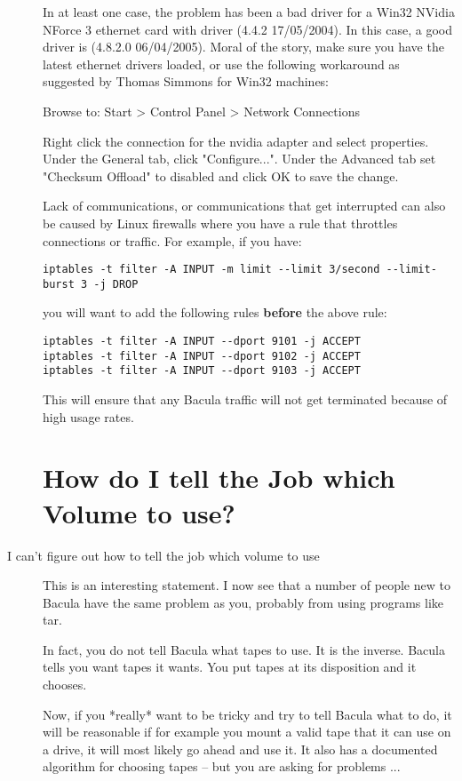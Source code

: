 \begin{description}
   In at least one case, the problem has been a bad driver for a Win32
   NVidia NForce 3 ethernet card with driver (4.4.2 17/05/2004).
   In this case, a good driver is (4.8.2.0 06/04/2005).  Moral of
   the story, make sure you have the latest ethernet drivers
   loaded, or use the following workaround as suggested by Thomas
   Simmons for Win32 machines:

   Browse to:
   Start {\textgreater} Control Panel {\textgreater} Network Connections

   Right click the connection for the nvidia adapter and select properties.
   Under the General tab, click "Configure...". Under the Advanced tab set
   "Checksum Offload" to disabled and click OK to save the change.

   Lack of communications, or communications that get interrupted can
   also be caused by Linux firewalls where you have a rule that throttles
   connections or traffic.  For example, if you have:

\footnotesize
\begin{verbatim}
iptables -t filter -A INPUT -m limit --limit 3/second --limit-burst 3 -j DROP
\end{verbatim}
\normalsize

   you will want to add the following rules {\bf before} the above rule:
\footnotesize
\begin{verbatim}
iptables -t filter -A INPUT --dport 9101 -j ACCEPT
iptables -t filter -A INPUT --dport 9102 -j ACCEPT
iptables -t filter -A INPUT --dport 9103 -j ACCEPT
\end{verbatim}
\normalsize
   This will ensure that any Bacula traffic will not get terminated because
   of high usage rates.

\section{How do I tell the Job which Volume to use?}
\item[I can't figure out how to tell the job which volume to use]
  This is an interesting statement. I now see that a number of people new to
  Bacula have the same problem as you, probably from using programs like tar.

  In fact, you do not tell Bacula what tapes to use.  It is the inverse.  Bacula
  tells you want tapes it wants.  You put tapes at its disposition and it
  chooses.

  Now, if you *really* want to be tricky and try to tell Bacula what to do, it
  will be reasonable if for example you mount a valid tape that it can use on a
  drive, it will most likely go ahead and use it.  It also has a documented
  algorithm for choosing tapes -- but you are asking for problems ...


\end{description}
